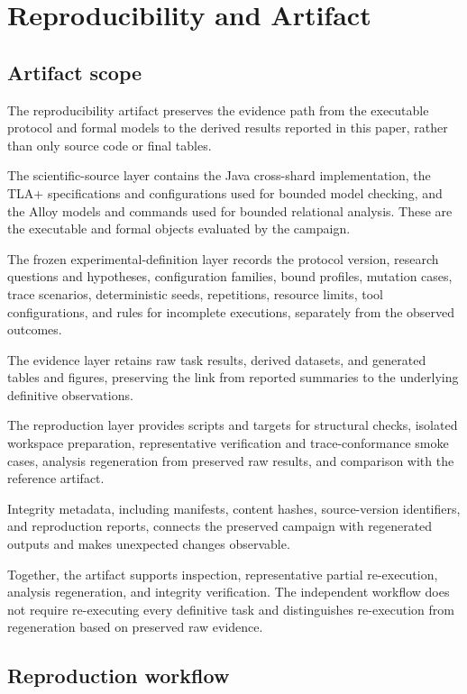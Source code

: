 \section{Reproducibility and Artifact}
\label{sec:reproducibility-artifact}

\subsection{Artifact scope}
\label{subsec:artifact-scope}

The reproducibility artifact preserves the evidence path from the executable
protocol and formal models to the derived results reported in this paper,
rather than only source code or final tables.

The scientific-source layer contains the Java cross-shard implementation,
the TLA+ specifications and configurations used for bounded model checking,
and the Alloy models and commands used for bounded relational analysis.
These are the executable and formal objects evaluated by the campaign.

The frozen experimental-definition layer records the protocol version,
research questions and hypotheses, configuration families, bound profiles,
mutation cases, trace scenarios, deterministic seeds, repetitions, resource
limits, tool configurations, and rules for incomplete executions, separately
from the observed outcomes.

The evidence layer retains raw task results, derived datasets, and generated
tables and figures, preserving the link from reported summaries to the
underlying definitive observations.

The reproduction layer provides scripts and targets for structural checks,
isolated workspace preparation, representative verification and
trace-conformance smoke cases, analysis regeneration from preserved raw
results, and comparison with the reference artifact.

Integrity metadata, including manifests, content hashes, source-version
identifiers, and reproduction reports, connects the preserved campaign with
regenerated outputs and makes unexpected changes observable.

Together, the artifact supports inspection, representative partial
re-execution, analysis regeneration, and integrity verification. The
independent workflow does not require re-executing every definitive task and
distinguishes re-execution from regeneration based on preserved raw evidence.

\subsection{Reproduction workflow}
\label{subsec:reproduction-workflow}

